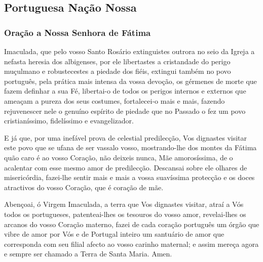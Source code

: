 \subsection{Portuguesa Nação Nossa}

\subsubsection{Oração a Nossa Senhora de Fátima}
 Imaculada, que pelo vosso Santo Rosário extinguistes outrora no seio da Igreja a nefasta heresia dos albigenses, por ele libertastes a cristandade do perigo muçulmano e robustecestes a piedade dos fiéis, extingui também no povo português, pela prática mais intensa da vossa devoção, os gérmenes de morte que fazem definhar a sua Fé, libertai-o de todos os perigos internos e externos que ameaçam a pureza dos seus costumes, fortalecei-o mais e mais, fazendo rejuvenescer nele o genuíno espírito de piedade que no Passado o fez um povo cristianíssimo, fidelíssimo e evangelizador.\par
E já que, por uma inefável prova de celestial predilecção, Vos dignastes visitar este povo que se ufana de ser vassalo vosso, mostrando-lhe dos montes da Fátima quão caro é ao vosso Coração, não deixeis nunca, Mãe amorosíssima, de o acalentar com esse mesmo amor de predilecção. Descansai sobre ele olhares de misericórdia, fazei-lhe sentir mais e mais a vossa suavíssima protecção e os doces atractivos do vosso Coração, que é coração de mãe.\par
Abençoai, ó Virgem Imaculada, a terra que Vos dignastes visitar, atraí a Vós todos os portugueses, patenteai-lhes os tesouros do vosso amor, revelai-lhes os arcanos do vosso Coração materno, fazei de cada coração português um órgão que vibre de amor por Vós e de Portugal inteiro um santuário de amor que corresponda com seu filial afecto ao vosso carinho maternal; e assim mereça agora e sempre ser chamado a Terra de Santa Maria. Amen.

